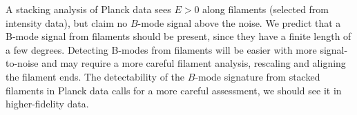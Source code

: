 

A stacking analysis of Planck data \citep{2016A&A...586A.141P} sees $E>0$ along filaments (selected from intensity data), but claim no $B$-mode signal above the noise. We predict that a B-mode signal from filaments should be present, since they have a finite length of a few degrees.  Detecting B-modes from filaments will be easier with more signal-to-noise and may require a more careful filament analysis, rescaling and aligning the filament ends.  The detectability of the $B$-mode signature from stacked filaments in Planck data calls for a more careful assessment, we should see it in higher-fidelity data.

 

